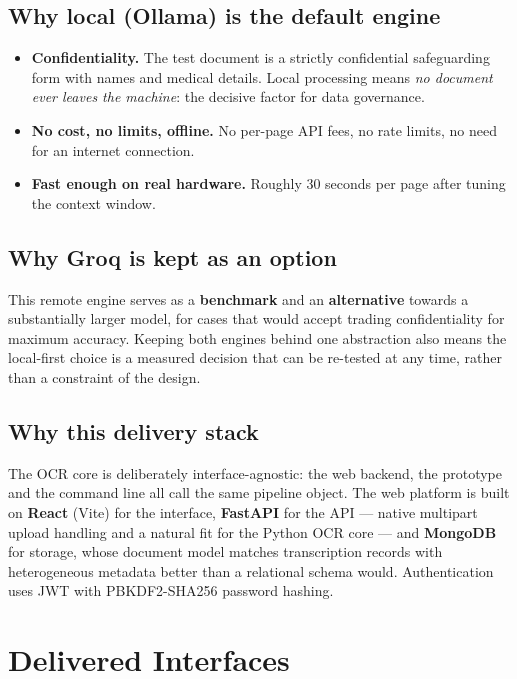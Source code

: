 \documentclass[11pt,a4paper]{article}
\begin{document}
\subsection{Why local (Ollama) is the default engine}
\begin{itemize}
  \item \textbf{Confidentiality.} The test document is a strictly confidential
        safeguarding form with names and medical details. Local processing means
        \emph{no document ever leaves the machine}: the decisive factor for data
        governance.
  \item \textbf{No cost, no limits, offline.} No per-page API fees, no rate
        limits, no need for an internet connection.
  \item \textbf{Fast enough on real hardware.} Roughly 30 seconds per page after
        tuning the context window.
\end{itemize}

\subsection{Why Groq is kept as an option}

This remote engine serves as a \textbf{benchmark} and an \textbf{alternative}
towards a substantially larger model, for cases that would accept trading
confidentiality for maximum accuracy. Keeping both engines behind one
abstraction also means the local-first choice is a measured decision that can be
re-tested at any time, rather than a constraint of the design.

\subsection{Why this delivery stack}

The OCR core is deliberately interface-agnostic: the web backend, the prototype
and the command line all call the same pipeline object. The web platform is
built on \textbf{React} (Vite) for the interface, \textbf{FastAPI} for the API
--- native multipart upload handling and a natural fit for the Python OCR core
--- and \textbf{MongoDB} for storage, whose document model matches transcription
records with heterogeneous metadata better than a relational schema would.
Authentication uses JWT with PBKDF2-SHA256 password hashing.

\section{Delivered Interfaces}
\end{document}
